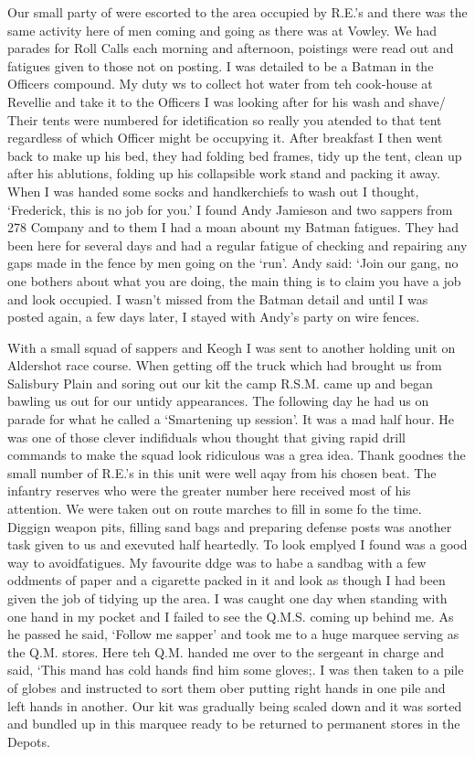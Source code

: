 Our small party of \sappers were escorted to the area occupied by
R.E.'s and there was the same activity here of men coming and going as
there was at Vowley. We had parades for Roll Calls each morning and
afternoon, poistings were read out and fatigues given to those not on
posting. I was detailed to be a Batman in the Officers compound. My
duty ws to collect hot water from teh cook-house at Revellie and take
it to the Officers I was looking after for his wash and shave/ Their
tents were numbered for idetification so really you atended to that
tent regardless of which Officer might be occupying it. After
breakfast I then went back to make up his bed, they had folding bed
frames, tidy up the tent, clean up after his ablutions, folding up his
collapsible work stand and packing it away. When I was handed some
socks and handkerchiefs to wash out I thought, `Frederick, this is no
job for you.' I found \lcorporal Andy Jamieson and two sappers from 278
Company and to them I had a moan abount my Batman fatigues. They had
been here for several days and had a regular fatigue of checking and
repairing any gaps made in the fence by men going on the `run'. Andy
said: `Join our gang, no one bothers about what you are doing, the
main thing is to claim you have a job and look occupied. I wasn't
missed from the Batman detail and until I was posted again, a few days
later, I stayed with Andy's party on wire fences.

With a small squad of sappers and \corporal Keogh I was sent to another
holding unit on Aldershot race course. When getting off the truck
which had brought us from Salisbury Plain and soring out our kit the
camp R.S.M. came up and began bawling us out for our untidy
appearances. The following day he had us on parade for what he called
a `Smartening up session'. It was a mad half hour. He was one of those
clever indifiduals whou thought that giving rapid drill commands to
make the squad look ridiculous was a grea idea. Thank goodnes the
small number of R.E.'s in this unit were well aqay from his chosen
beat. The infantry reserves who were the greater number here received
most of his attention. We were taken out on route marches to fill in
some fo the time. Diggign weapon pits, filling sand bags and preparing
defense posts was another task given to us and exevuted half
heartedly. To look emplyed I found was a good way to avoidfatigues. My
favourite ddge was to habe a sandbag with a few oddments of paper and
a cigarette packed in it and look as though I had been given the job
of tidying up the area. I was caught one day when standing with one
hand in my pocket and I failed to see the Q.M.S. coming up behind
me. As he passed he said, `Follow me sapper' and took me to a huge
marquee serving as the Q.M. stores. Here teh Q.M. handed me over to
the sergeant in charge and said, `This mand has cold hands find him
some gloves;. I was then taken to a pile of globes and instructed to
sort them ober putting right hands in one pile and left hands in
another. Our kit was gradually being scaled down and it was sorted and
bundled up in this marquee ready to be returned to permanent stores in
the Depots.

